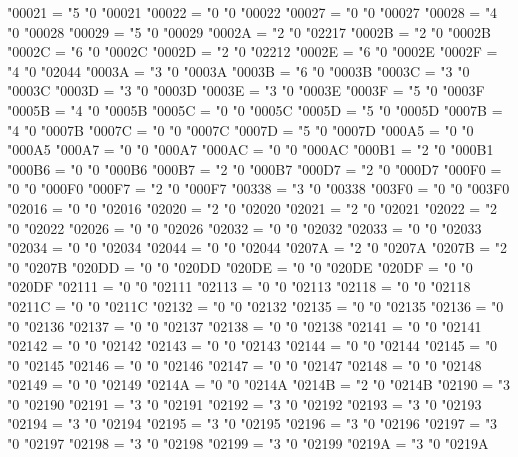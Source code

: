 \Umathcode "00021 = "5 "0 "00021
\Umathcode "00022 = "0 "0 "00022
\Umathcode "00027 = "0 "0 "00027
\Umathcode "00028 = "4 "0 "00028
\Umathcode "00029 = "5 "0 "00029
\Umathcode "0002A = "2 "0 "02217
\Umathcode "0002B = "2 "0 "0002B
\Umathcode "0002C = "6 "0 "0002C
\Umathcode "0002D = "2 "0 "02212
\Umathcode "0002E = "6 "0 "0002E
\Umathcode "0002F = "4 "0 "02044
\Umathcode "0003A = "3 "0 "0003A
\Umathcode "0003B = "6 "0 "0003B
\Umathcode "0003C = "3 "0 "0003C
\Umathcode "0003D = "3 "0 "0003D
\Umathcode "0003E = "3 "0 "0003E
\Umathcode "0003F = "5 "0 "0003F
\Umathcode "0005B = "4 "0 "0005B
\Umathcode "0005C = "0 "0 "0005C
\Umathcode "0005D = "5 "0 "0005D
\Umathcode "0007B = "4 "0 "0007B
\Umathcode "0007C = "0 "0 "0007C
\Umathcode "0007D = "5 "0 "0007D
\Umathcode "000A5 = "0 "0 "000A5
\Umathcode "000A7 = "0 "0 "000A7
\Umathcode "000AC = "0 "0 "000AC
\Umathcode "000B1 = "2 "0 "000B1
\Umathcode "000B6 = "0 "0 "000B6
\Umathcode "000B7 = "2 "0 "000B7
\Umathcode "000D7 = "2 "0 "000D7
\Umathcode "000F0 = "0 "0 "000F0
\Umathcode "000F7 = "2 "0 "000F7
\Umathcode "00338 = "3 "0 "00338
\Umathcode "003F0 = "0 "0 "003F0
\Umathcode "02016 = "0 "0 "02016
\Umathcode "02020 = "2 "0 "02020
\Umathcode "02021 = "2 "0 "02021
\Umathcode "02022 = "2 "0 "02022
\Umathcode "02026 = "0 "0 "02026
\Umathcode "02032 = "0 "0 "02032
\Umathcode "02033 = "0 "0 "02033
\Umathcode "02034 = "0 "0 "02034
\Umathcode "02044 = "0 "0 "02044
\Umathcode "0207A = "2 "0 "0207A
\Umathcode "0207B = "2 "0 "0207B
\Umathcode "020DD = "0 "0 "020DD
\Umathcode "020DE = "0 "0 "020DE
\Umathcode "020DF = "0 "0 "020DF
\Umathcode "02111 = "0 "0 "02111
\Umathcode "02113 = "0 "0 "02113
\Umathcode "02118 = "0 "0 "02118
\Umathcode "0211C = "0 "0 "0211C
\Umathcode "02132 = "0 "0 "02132
\Umathcode "02135 = "0 "0 "02135
\Umathcode "02136 = "0 "0 "02136
\Umathcode "02137 = "0 "0 "02137
\Umathcode "02138 = "0 "0 "02138
\Umathcode "02141 = "0 "0 "02141
\Umathcode "02142 = "0 "0 "02142
\Umathcode "02143 = "0 "0 "02143
\Umathcode "02144 = "0 "0 "02144
\Umathcode "02145 = "0 "0 "02145
\Umathcode "02146 = "0 "0 "02146
\Umathcode "02147 = "0 "0 "02147
\Umathcode "02148 = "0 "0 "02148
\Umathcode "02149 = "0 "0 "02149
\Umathcode "0214A = "0 "0 "0214A
\Umathcode "0214B = "2 "0 "0214B
\Umathcode "02190 = "3 "0 "02190
\Umathcode "02191 = "3 "0 "02191
\Umathcode "02192 = "3 "0 "02192
\Umathcode "02193 = "3 "0 "02193
\Umathcode "02194 = "3 "0 "02194
\Umathcode "02195 = "3 "0 "02195
\Umathcode "02196 = "3 "0 "02196
\Umathcode "02197 = "3 "0 "02197
\Umathcode "02198 = "3 "0 "02198
\Umathcode "02199 = "3 "0 "02199
\Umathcode "0219A = "3 "0 "0219A

